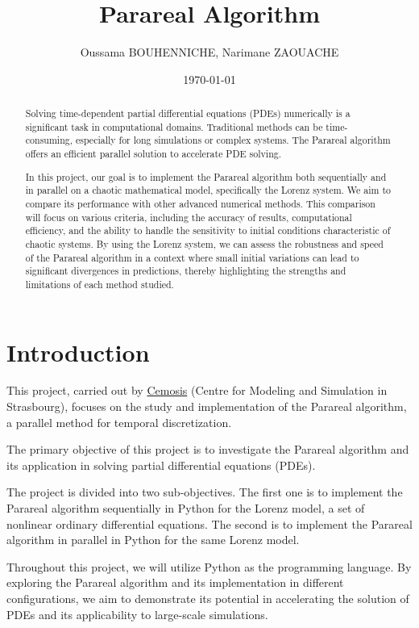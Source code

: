 \documentclass{article}
\title{Parareal Algorithm}
\author{Oussama  BOUHENNICHE, 
Narimane ZAOUACHE}
\date{\today}
\begin{document}
\maketitle

\begin{abstract}
    Solving time-de­pendent partial differe­ntial equations (PDEs) numerically is 
    a significant task in computational domains. Traditional methods can be­ 
    time-consuming, especially for long simulations or comple­x systems. 
    The Parareal algorithm \cite{lions2001resolution} offe­rs an efficient parallel solution to acce­lerate PDE solving.

    In this project, our goal is to implement the Parareal algorithm both sequentially and in parallel on a chaotic mathematical model, specifically the Lorenz system. We aim to compare its performance with other advanced numerical methods. This comparison will focus on various criteria, including the accuracy of results, computational efficiency, and the ability to handle the sensitivity to initial conditions characteristic of chaotic systems. By using the Lorenz system, we can assess the robustness and speed of the Parareal algorithm in a context where small initial variations can lead to significant divergences in predictions, thereby highlighting the strengths and limitations of each method studied.
    \end{abstract}

\section{Introduction}

    This project, carried out by \href{http://cemosis.fr}{Cemosis} \cite{cemosis} (Centre for Modeling and Simulation in Strasbourg),
    focuses on the study and implementation of the Parareal algorithm, a parallel method for temporal discretization. 


    The primary objective of this project is to investigate the Parareal algorithm and its application in solving partial differential equations (PDEs). 
    

    The project is divided into two sub-objectives. 
    The first one is to implement the Parareal algorithm sequentially in Python for the Lorenz model, 
    a set of nonlinear ordinary differential equations. 
    The second is to implement the Parareal algorithm in parallel in Python for the same Lorenz model. 

    Throughout this project, we will utilize Python as the programming language. 
    By exploring the Parareal algorithm and its implementation in different configurations, 
    we aim to demonstrate its potential in accelerating the solution of PDEs and its applicability to large-scale simulations.
\end{document}
